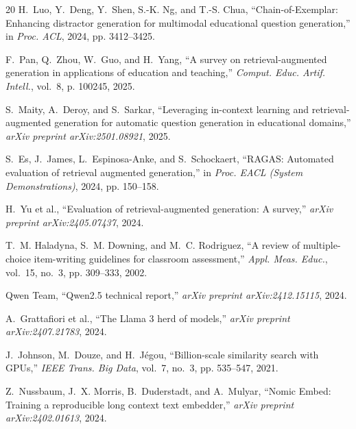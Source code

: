 \documentclass[conference]{IEEEtran}
\begin{document}
\begin{thebibliography}{20}
H.~Luo, Y.~Deng, Y.~Shen, S.-K. Ng, and T.-S. Chua, ``Chain-of-Exemplar: Enhancing distractor generation for multimodal educational question generation,'' in \emph{Proc. ACL}, 2024, pp. 3412--3425.

F.~Pan, Q.~Zhou, W.~Guo, and H.~Yang, ``A survey on retrieval-augmented generation in applications of education and teaching,'' \emph{Comput. Educ. Artif. Intell.}, vol.~8, p. 100245, 2025.

S.~Maity, A.~Deroy, and S.~Sarkar, ``Leveraging in-context learning and retrieval-augmented generation for automatic question generation in educational domains,'' \emph{arXiv preprint arXiv:2501.08921}, 2025.

S.~Es, J.~James, L.~Espinosa-Anke, and S.~Schockaert, ``RAGAS: Automated evaluation of retrieval augmented generation,'' in \emph{Proc. EACL (System Demonstrations)}, 2024, pp. 150--158.

H.~Yu et al., ``Evaluation of retrieval-augmented generation: A survey,'' \emph{arXiv preprint arXiv:2405.07437}, 2024.

T.~M. Haladyna, S.~M. Downing, and M.~C. Rodriguez, ``A review of multiple-choice item-writing guidelines for classroom assessment,'' \emph{Appl. Meas. Educ.}, vol.~15, no.~3, pp. 309--333, 2002.

Qwen Team, ``Qwen2.5 technical report,'' \emph{arXiv preprint arXiv:2412.15115}, 2024.

A.~Grattafiori et al., ``The Llama 3 herd of models,'' \emph{arXiv preprint arXiv:2407.21783}, 2024.

J.~Johnson, M.~Douze, and H.~J{\'e}gou, ``Billion-scale similarity search with GPUs,'' \emph{IEEE Trans. Big Data}, vol.~7, no.~3, pp. 535--547, 2021.

Z.~Nussbaum, J.~X. Morris, B.~Duderstadt, and A.~Mulyar, ``Nomic Embed: Training a reproducible long context text embedder,'' \emph{arXiv preprint arXiv:2402.01613}, 2024.

\end{thebibliography}
\end{document}
